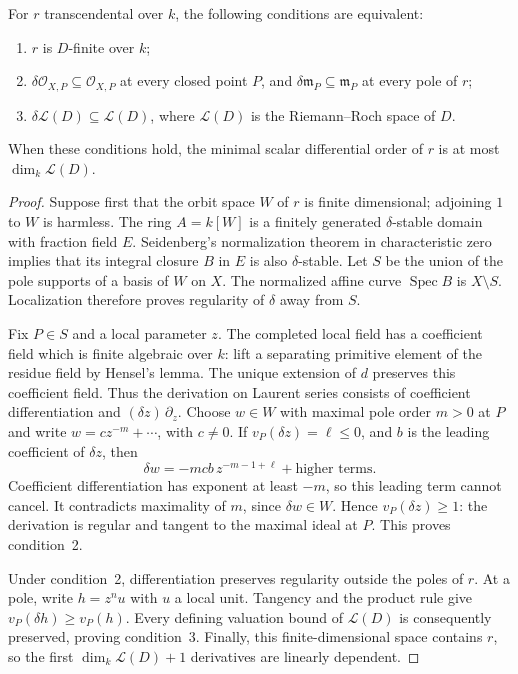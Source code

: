 \begin{theorem}
\label{int:curve}
For $r$ transcendental over $k$, the following conditions are equivalent:
\begin{enumerate}
\item $r$ is $D$-finite over $k$;
\item $\delta\mathcal O_{X,P}\subseteq\mathcal O_{X,P}$ at every closed
point $P$, and $\delta\mathfrak m_P\subseteq\mathfrak m_P$ at every pole
of $r$;
\item $\delta\mathcal L(D)\subseteq\mathcal L(D)$, where
$\mathcal L(D)$ is the Riemann--Roch space of $D$.
\end{enumerate}
When these conditions hold, the minimal scalar differential order of $r$
is at most $\dim_k\mathcal L(D)$.
\end{theorem}
\begin{proof}
Suppose first that the orbit space $W$ of $r$ is finite dimensional;
adjoining $1$ to $W$ is harmless.  The ring $A=k[W]$ is a finitely
generated $\delta$-stable domain with fraction field $E$.
Seidenberg's normalization theorem in characteristic zero~\cite{Seidenberg1966} implies that
its integral closure $B$ in $E$ is also $\delta$-stable.
Let $S$ be the union of the pole supports of a basis of $W$ on $X$.
The normalized affine curve $\operatorname{Spec}B$ is $X\setminus S$.
Localization therefore proves regularity of $\delta$ away from $S$.

Fix $P\in S$ and a local parameter $z$.  The completed local field has
a coefficient field which is finite algebraic over $k$: lift a separating
primitive element of the residue field by Hensel's lemma.  The unique
extension of $d$ preserves this coefficient field.  Thus the derivation
on Laurent series consists of coefficient differentiation and
$(\delta z)\,\partial_z$.
Choose $w\in W$ with maximal pole order $m>0$ at $P$ and write
$w=c z^{-m}+\cdots$, with $c\ne0$.  If
$v_P(\delta z)=\ell\leq0$, and $b$ is the leading coefficient of
$\delta z$, then
\[
 \delta w=-mcb\,z^{-m-1+\ell}+\text{higher terms}.
\]
Coefficient differentiation has exponent at least $-m$, so this leading
term cannot cancel.  It contradicts maximality of $m$, since
$\delta w\in W$.  Hence $v_P(\delta z)\geq1$: the derivation is regular
and tangent to the maximal ideal at $P$.  This proves condition~2.

Under condition~2, differentiation preserves regularity outside the poles
of $r$.  At a pole, write $h=z^n u$ with $u$ a local unit.  Tangency and
the product rule give $v_P(\delta h)\geq v_P(h)$.  Every defining
valuation bound of $\mathcal L(D)$ is consequently preserved, proving
condition~3.  Finally, this finite-dimensional space contains $r$, so
the first $\dim_k\mathcal L(D)+1$ derivatives are linearly dependent.
\end{proof}


